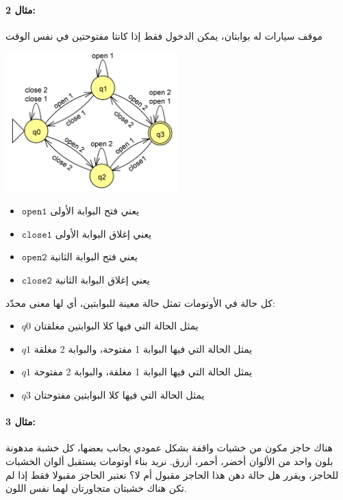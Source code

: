 ﻿\documentclass[12pt]{article}
\begin{document}
\paragraph{مثال 2:} موقف سيارات له بوابتان، يمكن الدخول فقط إذا كانتا مفتوحتين في نفس الوقت
\begin{center}
\includegraphics[width=0.5\textwidth]{../../../images/DFAs/02_two_gates_to_open_dfa.png}
\end{center}

\begin{itemize}
    \item $\mathtt{open 1}$ يعني فتح البوابة الأولى
    \item $\mathtt{close 1}$ يعني إغلاق البوابة الأولى
    \item $\mathtt{open 2}$ يعني فتح البوابة الثانية
    \item $\mathtt{close 2}$ يعني إغلاق البوابة الثانية
\end{itemize}

كل حالة في الأوتومات تمثل حالة معينة للبوابتين، أي لها معنى محدّد:
\begin{itemize}
    \item $q0$ يمثل الحالة التي فيها كلا البوابتين مغلقتان
    \item $q1$ يمثل الحالة التي فيها البوابة 1 مفتوحة، والبوابة 2 مغلقة
    \item $q1$ يمثل الحالة التي فيها البوابة 1 مغلقة، والبوابة 2 مفتوحة
    \item $q3$ يمثل الحالة التي فيها كلا البوابتين مفتوحتان
\end{itemize}


\paragraph{مثال 3:} هناك حاجز مكون من خشبات واقفة بشكل عمودي بجانب بعضها، كل خشبة مدهونة بلون واحد من الألوان أخضر، أحمر، أزرق. نريد بناء أوتومات يستقبل ألوان الخشبات للحاجز، ويقرر هل حالة دهن هذا الحاجز مقبول أم لا؟
نعتبر الحاجز مقبولا فقط إذا لم تكن هناك خشبتان متجاورتان لهما نفس اللون.
\end{document}
